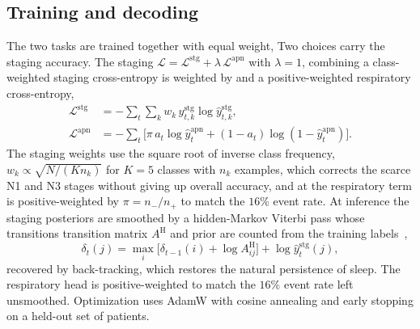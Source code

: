 \documentclass[preprint,12pt]{elsarticle}
\providecommand{\DIFaddtex}[1]{{\protect\color{blue} \sf #1}} %
\providecommand{\DIFdeltex}[1]{{\protect\color{red} \scriptsize #1}} %
\providecommand{\DIFaddbegin}{} %
\providecommand{\DIFaddend}{} %
\providecommand{\DIFdelbegin}{} %
\providecommand{\DIFdelend}{} %
\providecommand{\DIFadd}[1]{\texorpdfstring{\DIFaddtex{#1}}{#1}} %
\providecommand{\DIFdel}[1]{\texorpdfstring{\DIFdeltex{#1}}{}} %
\providecommand{\DIFscaledelfig}{0.5}
\newlength{\DIFdelgraphicswidth} %
\newlength{\DIFdelgraphicsheight} %
\providecommand{\DIFaddincludegraphics}[2][]{{\color{blue}\fbox{\DIFOincludegraphics[#1]{#2}}}} %
\providecommand{\DIFdelincludegraphics}[2][]{%
\sbox{\DIFdelgraphicsbox}{\DIFOincludegraphics[#1]{#2}}%
\settoboxwidth{\DIFdelgraphicswidth}{\DIFdelgraphicsbox} %
\settoboxtotalheight{\DIFdelgraphicsheight}{\DIFdelgraphicsbox} %
\scalebox{\DIFscaledelfig}{%
\parbox[b]{\DIFdelgraphicswidth}{\usebox{\DIFdelgraphicsbox}\\[-\baselineskip] \rule{\DIFdelgraphicswidth}{0em}}\llap{\resizebox{\DIFdelgraphicswidth}{\DIFdelgraphicsheight}{%
\setlength{\unitlength}{\DIFdelgraphicswidth}%
\begin{picture}(1,1)%
\thicklines\linethickness{2pt} %
{\color[rgb]{1,0,0}\put(0,0){\framebox(1,1){}}}%
{\color[rgb]{1,0,0}\put(0,0){\line( 1,1){1}}}%
{\color[rgb]{1,0,0}\put(0,1){\line(1,-1){1}}}%
\end{picture}%
}\hspace*{3pt}}} %
} %
\DeclareRobustCommand{\DIFaddbegin}{\DIFOaddbegin \let\includegraphics\DIFaddincludegraphics} %
\DeclareRobustCommand{\DIFaddend}{\DIFOaddend \let\includegraphics\DIFOincludegraphics} %
\DeclareRobustCommand{\DIFdelbegin}{\DIFOdelbegin \let\includegraphics\DIFdelincludegraphics} %
\DeclareRobustCommand{\DIFdelend}{\DIFOaddend \let\includegraphics\DIFOincludegraphics} %
\begin{document}
\subsection{Training and decoding}
The two tasks are trained together with equal weight, \DIFdelbegin %
\DIFdel{Two choices carry the staging accuracy. The staging }\DIFdelend \DIFaddbegin \DIFadd{$\mathcal{L}=\mathcal{L}^{\mathrm{stg}}+\lambda\,\mathcal{L}^{\mathrm{apn}}$ with $\lambda=1$, combining a class-weighted staging }\DIFaddend cross-entropy \DIFdelbegin \DIFdel{is weighted by }\DIFdelend \DIFaddbegin \DIFadd{and a positive-weighted respiratory cross-entropy,
}\begin{align}
\mathcal{L}^{\mathrm{stg}}&=-\sum_t\sum_{k}w_k\,y^{\mathrm{stg}}_{t,k}\log\hat y^{\mathrm{stg}}_{t,k},\\
\mathcal{L}^{\mathrm{apn}}&=-\sum_t\big[\pi\,a_t\log\hat y^{\mathrm{apn}}_t+(1-a_t)\log(1-\hat y^{\mathrm{apn}}_t)\big].
\end{align}
\DIFadd{The staging weights use }\DIFaddend the square root of inverse class frequency,
\DIFaddbegin \DIFadd{$w_k\propto\sqrt{N/(K n_k)}$ for $K=5$ classes with $n_k$ examples, }\DIFaddend which corrects the scarce
N1 and N3 stages without giving up overall accuracy, and \DIFdelbegin \DIFdel{at }\DIFdelend \DIFaddbegin \DIFadd{the respiratory term is
positive-weighted by $\pi=n_-/n_+$ to match the $16\%$ event rate. At }\DIFaddend inference the staging
posteriors are smoothed by a hidden-Markov Viterbi pass whose \DIFdelbegin \DIFdel{transitions }\DIFdelend \DIFaddbegin \DIFadd{transition matrix $A^{\mathrm H}$
and prior }\DIFaddend are counted from the training labels~\cite{chen2024hmm},
\DIFaddbegin \begin{equation}
\delta_t(j)=\max_i\big[\delta_{t-1}(i)+\log A^{\mathrm H}_{ij}\big]+\log\hat y^{\mathrm{stg}}_t(j),
\end{equation}
\DIFadd{recovered by back-tracking, }\DIFaddend which restores the natural persistence of sleep. The respiratory
head is \DIFdelbegin \DIFdel{positive-weighted to match
the $16\%$ event rate}\DIFdelend \DIFaddbegin \DIFadd{left unsmoothed}\DIFaddend . Optimization uses AdamW with cosine annealing and early stopping on a
held-out set of patients.
\end{document}
